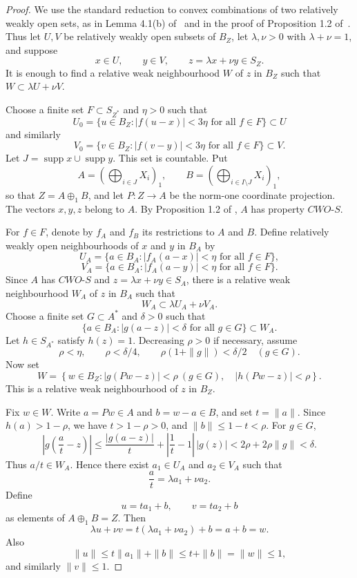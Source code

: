 \documentclass[11pt]{article}
\newcommand{\CWOS}{\textit{CWO-S}}
\begin{document}
\begin{proof}
We use the standard reduction to convex combinations of two relatively weakly
open sets, as in Lemma 4.1(b) of~\cite{ABHLP} and in the proof of Proposition
1.2 of~\cite{HKP25}.  Thus let \(U,V\) be relatively weakly open subsets of
\(B_Z\), let \(\lambda,\nu>0\) with \(\lambda+\nu=1\), and suppose
\[
  x\in U,\qquad y\in V,\qquad z=\lambda x+\nu y\in S_Z.
\]
It is enough to find a relative weak neighbourhood \(W\) of \(z\) in \(B_Z\)
such that \(W\subset \lambda U+\nu V\).

Choose a finite set \(F\subset S_{Z^*}\) and \(\eta>0\) such that
\[
  U_0=\{u\in B_Z: |f(u-x)|<3\eta \text{ for all } f\in F\}\subset U
\]
and similarly
\[
  V_0=\{v\in B_Z: |f(v-y)|<3\eta \text{ for all } f\in F\}\subset V.
\]
Let \(J=\operatorname{supp}x\cup\operatorname{supp}y\).  This set is
countable.  Put
\[
  A=\left(\bigoplus_{i\in J}X_i\right)_1,\qquad
  B=\left(\bigoplus_{i\in I\setminus J}X_i\right)_1,
\]
so that \(Z=A\oplus_1 B\), and let \(P:Z\to A\) be the norm-one coordinate
projection.  The vectors \(x,y,z\) belong to \(A\).  By Proposition 1.2 of
\cite{HKP25}, \(A\) has property \(\CWOS\).

For \(f\in F\), denote by \(f_A\) and \(f_B\) its restrictions to \(A\) and
\(B\).  Define relatively weakly open neighbourhoods of \(x\) and \(y\) in
\(B_A\) by
\[
  U_A=\{a\in B_A: |f_A(a-x)|<\eta \text{ for all } f\in F\},
\]
\[
  V_A=\{a\in B_A: |f_A(a-y)|<\eta \text{ for all } f\in F\}.
\]
Since \(A\) has \(\CWOS\) and \(z=\lambda x+\nu y\in S_A\), there is a
relative weak neighbourhood \(W_A\) of \(z\) in \(B_A\) such that
\[
  W_A\subset \lambda U_A+\nu V_A.
\]
Choose a finite set \(G\subset A^*\) and \(\delta>0\) such that
\[
  \{a\in B_A: |g(a-z)|<\delta \text{ for all } g\in G\}\subset W_A.
\]
Let \(h\in S_{A^*}\) satisfy \(h(z)=1\).  Decreasing \(\rho>0\) if necessary,
assume
\[
  \rho<\eta,\qquad
  \rho<\delta/4,\qquad
  \rho(1+\|g\|)<\delta/2 \quad(g\in G).
\]
Now set
\[
  W=\left\{w\in B_Z:
  |g(Pw-z)|<\rho \ (g\in G),\quad |h(Pw-z)|<\rho\right\}.
\]
This is a relative weak neighbourhood of \(z\) in \(B_Z\).

Fix \(w\in W\).  Write \(a=Pw\in A\) and \(b=w-a\in B\), and set
\(t=\|a\|\).  Since \(h(a)>1-\rho\), we have \(t>1-\rho>0\), and
\(\|b\|\le 1-t<\rho\).  For \(g\in G\),
\[
  \left|g\left(\frac{a}{t}-z\right)\right|
  \le \frac{|g(a-z)|}{t}+\left|\frac1t-1\right|\,|g(z)|
  <2\rho+2\rho\|g\|<\delta.
\]
Thus \(a/t\in W_A\).  Hence there exist \(a_1\in U_A\) and \(a_2\in V_A\)
such that
\[
  \frac{a}{t}=\lambda a_1+\nu a_2.
\]
Define
\[
  u=ta_1+b,\qquad v=ta_2+b
\]
as elements of \(A\oplus_1B=Z\).  Then
\[
  \lambda u+\nu v=t(\lambda a_1+\nu a_2)+b=a+b=w.
\]
Also
\[
  \|u\|\le t\|a_1\|+\|b\|\le t+\|b\|=\|w\|\le1,
\]
and similarly \(\|v\|\le1\).


\end{proof}
\end{document}
